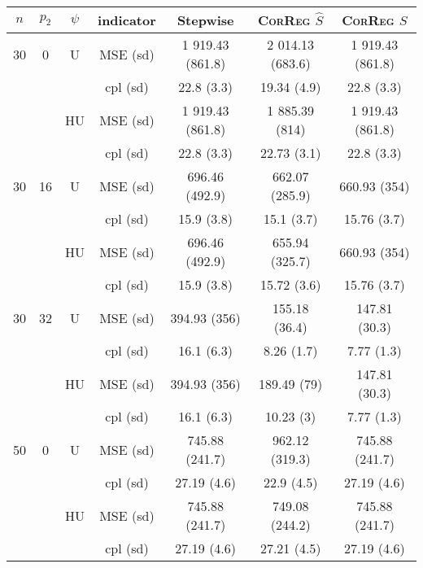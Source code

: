 \documentclass[11pt,a4paper]{article}
\begin{document}
\begin{table}[h!]
\centering
\begin{tabular}{|c|c|c|c|c|c|c|}
\hline 
$n$ & $p_2$&  $\psi$ &indicator &Stepwise  &    \textsc{CorReg} $\hat S$& \textsc{CorReg} $S$\\ 
\hline %
30 & 0 & U& MSE (sd) & 1 919.43 (861.8) & 2 014.13 (683.6) & 1 919.43 (861.8) \\
& & &cpl (sd) & 22.8 (3.3) & 19.34 (4.9) & 22.8 (3.3) \\
 &  &HU &MSE (sd) & 1 919.43 (861.8) & 1 885.39 (814) & 1 919.43 (861.8) \\
& & & cpl (sd) & 22.8 (3.3) & 22.73 (3.1) & 22.8 (3.3) \\
\hline %
30 & 16 & U&MSE (sd) & 696.46 (492.9) & 662.07 (285.9) & 660.93 (354) \\
& & & cpl (sd) & 15.9 (3.8) & 15.1 (3.7) & 15.76 (3.7) \\
 &  &HU &MSE (sd) & 696.46 (492.9) & 655.94 (325.7) & 660.93 (354) \\
& & & cpl (sd) & 15.9 (3.8) & 15.72 (3.6) & 15.76 (3.7) \\
\hline %
30 & 32 & U & MSE (sd) & 394.93 (356) & 155.18 (36.4) & 147.81 (30.3) \\
& & &cpl (sd) & 16.1 (6.3) & 8.26 (1.7) & 7.77 (1.3) \\
 &  & HU &  MSE (sd) & 394.93 (356) & 189.49 (79) & 147.81 (30.3) \\
& & & cpl (sd) & 16.1 (6.3) & 10.23 (3) & 7.77 (1.3) \\
\hline
\hline %
50 & 0 & U&MSE (sd) & 745.88 (241.7) & 962.12 (319.3) & 745.88 (241.7) \\
& & & cpl (sd) & 27.19 (4.6) & 22.9 (4.5) & 27.19 (4.6) \\
 &  & HU &MSE (sd) & 745.88 (241.7) & 749.08 (244.2) & 745.88 (241.7) \\
& & & cpl (sd) & 27.19 (4.6) & 27.21 (4.5) & 27.19 (4.6) \\

\end{tabular}
\end{table}
\end{document}
